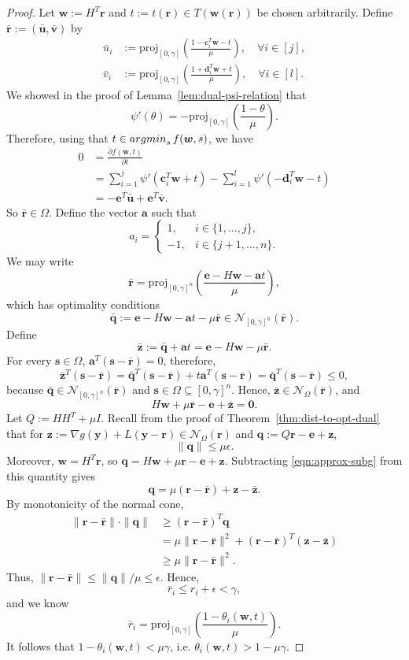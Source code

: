 \documentclass[10pt,a4paper]{amsart}
\newcommand\argmin{\mathop{\rm argmin}}
\newcommand\bz{\bm{0}}
\newcommand\e{\bm{e}}
\newcommand\mN{\mathcal{N}}
\newcommand\proj{\mathrm{proj}}
\newcommand\q{\bm{q}}
\newcommand\s{\bm{s}}
\newcommand\w{\bm{w}}
\newcommand\y{\bm{y}}
\newcommand\z{\bm{z}}
\renewcommand\r{\bm{r}}
\renewcommand\u{\bm{u}}
\renewcommand\v{\bm{v}}
\renewcommand{\a}{\bm{a}}
\renewcommand{\c}{\bm{c}}
\renewcommand{\d}{\bm{d}}
\begin{document}
\begin{proof}
Let $\w := H^T\r$ and $t := t(\r) \in T(\w(\r))$ be chosen arbitrarily. Define $\bar{\r} := (\bar{\u}, \bar{\v})$ by
\begin{align*}
    \bar{u}_i &:= \proj_{[0,\gamma]}\left(\frac{1-\c_i^T\w - t}{\mu}\right),\quad\forall i \in [j],\\
    \bar{v}_i &:= \proj_{[0,\gamma]}\left(\frac{1+\d_i^T\w + t}{\mu}\right),\quad\forall i \in [l].
\end{align*}
We showed in the proof of Lemma~\ref{lem:dual-psi-relation} that
\[
    \psi'(\theta) = -\proj_{[0,\gamma]}\left(\frac{1-\theta}{\mu}\right).
\]
Therefore, using that $t \in \argmin_{s} f(\w,s)$, we have
\begin{align*}
    0 &= \frac{\partial f(\w,t)}{\partial t}\\
      &= \sum_{i=1}^j \psi'(\c_i^T\w + t) - \sum_{i=1}^l \psi'(-\d_i^T\w - t)\\
      &= -\e^T\bar{\u} + \e^T\bar{\v}.
\end{align*}
So $\bar{\r} \in \Omega$. Define the vector $\a$ such that
\[
    a_i = \begin{cases}
        1, & i \in \{1,\hdots,j\},\\
        -1, & i \in \{j+1,\hdots,n\}.
    \end{cases}
\]
We may write
\[
    \bar{\r} = \proj_{[0,\gamma]^n}\left(\frac{\e - H\w - \a t}{\mu}\right),
\]
which has optimality conditions
\[
    \bar{\q} := \e - H\w - \a t - \mu\bar{\r} \in \mN_{[0,\gamma]^n}(\bar{\r}).
\]
Define
\[
    \bar{\z} := \bar{\q} + \a t = \e - H\w - \mu\bar{\r}.
\]
For every $\s \in \Omega$, $\a^T(\s - \bar{\r}) = 0$, therefore,
\[
    \bar{\z}^T(\s - \bar{\r}) = \bar{\q}^T(\s - \bar{\r}) + t\a^T(\s - \bar{\r}) = \bar{\q}^T(\s - \bar{\r}) \leq 0,
\]
because $\bar{\q} \in \mN_{[0,\gamma]^n}(\bar{\r})$ and $\s \in \Omega \subseteq [0,\gamma]^n$. Hence, $\bar{\z} \in \mN_{\Omega}(\bar{\r})$, and
\begin{equation} \label{eqn:approx-subg}
    H\w + \mu\bar{\r} - \e + \bar{\z} = \bz.
\end{equation}
Let $Q := HH^T + \mu I$. Recall from the proof of Theorem~\ref{thm:dist-to-opt-dual} that for $\z := \nabla g(\y) + L(\y - \r) \in \mN_{\Omega}(\r)$ and $\q := Q\r - \e + \z$,
\[
    \|\q\| \leq \mu\epsilon.
\]
Moreover, $\w = H^T\r$, so $\q = H\w + \mu\r - \e + \z$. Subtracting \eqref{eqn:approx-subg} from this quantity gives
\[
    \q = \mu(\r - \bar{\r}) + \z - \bar{\z}.
\]
By monotonicity of the normal cone,
\begin{align*}
\|\r- \bar{\r}\|\cdot\|\q\| &\geq (\r - \bar{\r})^T\q\\
                            &= \mu\|\r - \bar{\r}\|^2 + (\r - \bar{\r})^T(\z - \bar{\z})\\
                            &\geq \mu\|\r - \bar{\r}\|^2.
\end{align*}
Thus, $\|\r - \bar{\r}\| \leq \|\q\|/\mu \leq \epsilon$. Hence,
\[
    \bar{r}_i \leq r_i + \epsilon < \gamma,
\]
and we know
\[
    \bar{r}_i = \proj_{[0,\gamma]}\left(\frac{1-\theta_i(\w,t)}{\mu}\right).
\]
It follows that $1 - \theta_i(\w,t) < \mu\gamma$, i.e. $\theta_i(\w,t) > 1 - \mu\gamma$.


\end{proof}
\end{document}
